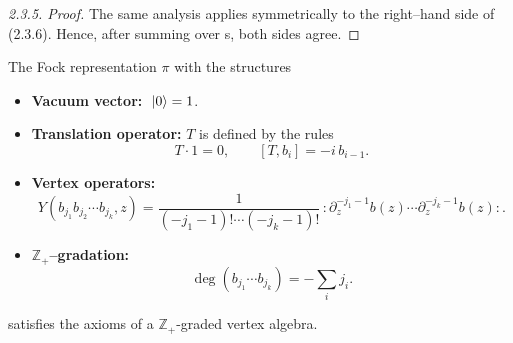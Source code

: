 \documentclass[12pt]{article}
\begin{document}
\begin{proof}[2.3.5. Proof]
    The same analysis applies symmetrically to the right–hand side of (2.3.6). Hence, after summing over s, both sides agree.
\end{proof}





\begin{theorem}[2.3.7]
    The Fock representation $\pi$ with the structures
    \begin{itemize}
        \item \textbf{Vacuum vector:} $\;\lvert 0 \rangle=1$.
        \item \textbf{Translation operator:} $T$ is defined by the rules
              \[
                  T\cdot 1 = 0, \qquad [T,b_i] = -i\,b_{i-1}.
              \]
        \item \textbf{Vertex operators:}
              \[
                  Y(b_{j_1}b_{j_2}\cdots b_{j_k},z)
                  = \frac{1}{(-j_1-1)!\cdots(-j_k-1)!}\,
                  :\partial_z^{-j_1-1}b(z)\cdots \partial_z^{-j_k-1}b(z):.
              \]
        \item \textbf{$\mathbb{Z}_+$–gradation:}
              \[
                  \deg(b_{j_1}\cdots b_{j_k}) = -\sum_i j_i.
              \]
    \end{itemize}
    satisfies the axioms of a $\mathbb{Z}_+$-graded vertex algebra.
\end{theorem}
\end{document}
